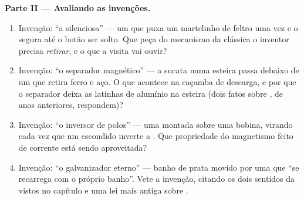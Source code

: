 \begin{problem}
\medskip\noindent\textbf{Parte II --- Avaliando as invenções.}
\begin{enumerate}[resume]
  \item Invenção: ``a  silenciosa'' --- um  que
        puxa um martelinho de feltro uma vez e o segura até o botão
        ser solto. Que peça do mecanismo da  clássica o
        inventor precisa \emph{retirar}, e o que a visita vai ouvir?
  \item Invenção: ``o separador magnético'' --- a sucata numa esteira
        passa debaixo de um  que retira ferro e aço. O que
        acontece na caçamba de descarga, e por que o separador deixa
        as latinhas de alumínio na esteira (dois fatos sobre , de
        anos anteriores, respondem)?
  \item Invenção: ``o inversor de polos'' --- uma  montada
        sobre uma bobina, virando cada vez que um 
        escondido inverte a . Que propriedade do magnetismo
        feito de corrente está sendo aproveitada?
  \item Invenção: ``o galvanizador eterno'' --- banho de prata movido
        por uma  que ``se recarrega com o próprio banho''. Vete
        a invenção, citando os dois sentidos da  vistos no
        capítulo e uma lei mais antiga sobre .
\end{enumerate}


\end{problem}
